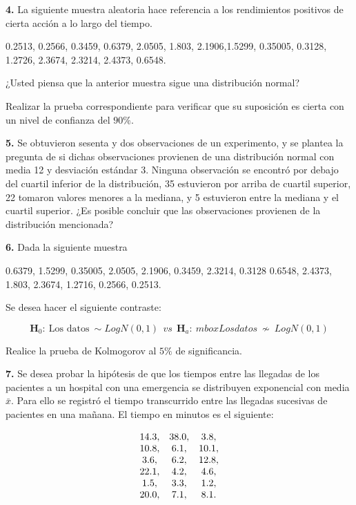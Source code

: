 \documentclass[
  a4paper,
  oneside,
  openany]{book}
\begin{document}
\textbf{4.} La siguiente muestra aleatoria hace referencia a los rendimientos positivos de cierta acción a lo largo del tiempo.

0.2513, 0.2566, 0.3459, 0.6379, 2.0505, 1.803, 2.1906,1.5299,
0.35005, 0.3128, 1.2726, 2.3674, 2.3214, 2.4373, 0.6548.

¿Usted piensa que la anterior muestra sigue una distribución normal?

Realizar la prueba correspondiente para verificar que su suposición es cierta con un nivel de confianza del \(90\%\).

\textbf{5.} Se obtuvieron sesenta y dos observaciones de un experimento, y se plantea la pregunta de si dichas observaciones provienen de una distribución normal con media 12 y desviación estándar 3. Ninguna observación se encontró por debajo del cuartil inferior de la distribución, 35 estuvieron por arriba de cuartil superior, 22 tomaron valores menores a la mediana, y 5 estuvieron entre la mediana y el cuartil superior. ¿Es posible concluir que las observaciones provienen de la distribución mencionada?

\textbf{6.} Dada la siguiente muestra

0.6379, 1.5299, 0.35005, 2.0505, 2.1906, 0.3459, 2.3214, 0.3128
0.6548, 2.4373, 1.803, 2.3674, 1.2716, 0.2566, 0.2513.

Se desea hacer el siguiente contraste:

\[\textbf{H}_0: \ \mbox{Los datos} \ \sim LogN(0,1) \ \ vs \ \ \textbf{H}_a: \ mbox{Los datos} \  \nsim \ LogN(0,1)\]

Realice la prueba de Kolmogorov al \(5\%\) de significancia.

\textbf{7.} Se desea probar la hipótesis de que los tiempos entre las llegadas de los pacientes a un hospital con una emergencia se distribuyen exponencial con media \(\bar{x}\). Para ello se registró el tiempo transcurrido entre las llegadas sucesivas de pacientes en una mañana. El tiempo en minutos es el siguiente:

\[
\begin{array}{c c c}
14.3, & 38.0, & 3.8,  \\ 
10.8, & 6.1,& 10.1, \\ 
3.6, & 6.2, & 12.8, \\ 
22.1, & 4.2, & 4.6,  \\ 
1.5, & 3.3, & 1.2,  \\   
20.0, & 7.1,& 8.1.\\
\end{array}
\]
\end{document}
